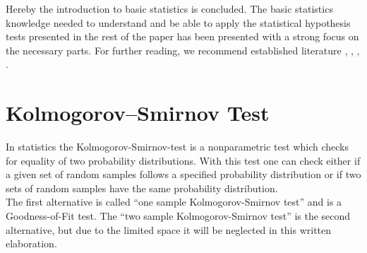 \documentclass{article}
\theoremstyle{definition}
\begin{document}
Hereby the introduction to basic statistics is concluded.
The basic statistics knowledge needed to understand and be able to apply the statistical hypothesis tests presented in the rest of the paper has been presented with a strong focus on the necessary parts.
For further reading, we recommend established literature \cite{conover1980practical}, \cite{kendall1976advanced}, \cite{siegel1956nonparametric}, \cite{weigand2009statistik}.

\section{Kolmogorov–Smirnov Test}
In statistics the Kolmogorov-Smirnov-test is a nonparametric test which checks for equality of two probability distributions.
With this test one can check either if a given set of random samples follows a specified probability distribution or if two sets of random samples have the same probability distribution.\\
The first alternative is called ``one sample Kolmogorov-Smirnov test'' and is a Goodness-of-Fit test. The ``two sample  Kolmogorov-Smirnov test'' is the second alternative, but due to the limited space it will be neglected in this written elaboration.
\end{document}
